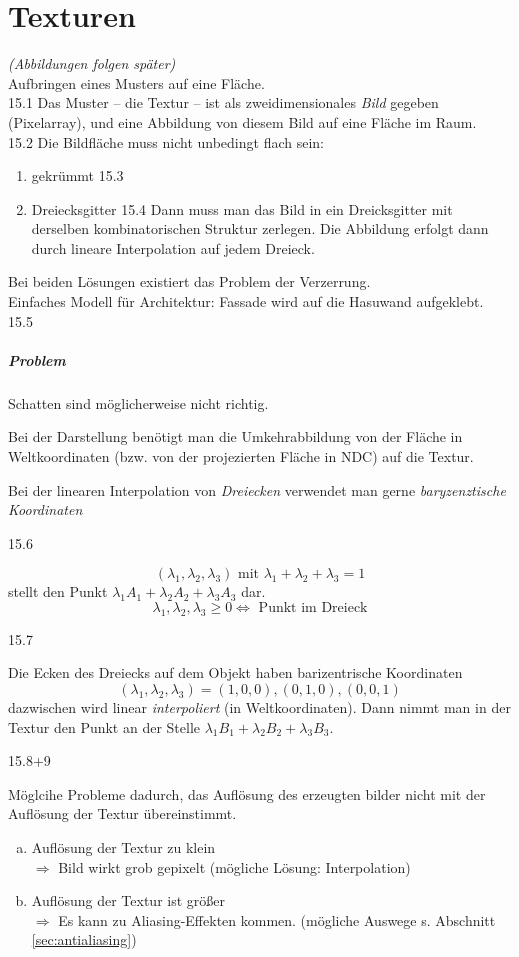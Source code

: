 \chapter{Texturen}
\emph{(Abbildungen folgen später)}\\
Aufbringen eines Musters auf eine Fläche.\\[1em]
15.1
Das Muster -- die Textur -- ist als zweidimensionales \emph{Bild} gegeben (Pixelarray), und eine Abbildung
von diesem Bild auf eine Fläche im Raum.\\[1em]
15.2
Die Bildfläche muss nicht unbedingt flach sein:
\begin{enumerate}
 \item gekrümmt 15.3
 \item Dreiecksgitter 15.4
	Dann muss man das Bild in ein Dreicksgitter mit derselben kombinatorischen Struktur zerlegen.
	Die Abbildung erfolgt dann durch lineare Interpolation auf jedem Dreieck.
\end{enumerate}
Bei beiden Lösungen existiert das Problem der Verzerrung.\\[1em]
Einfaches Modell für Architektur: Fassade wird auf die Hasuwand aufgeklebt.
15.5
\paragraph*{Problem} Schatten sind möglicherweise nicht richtig.

Bei der Darstellung benötigt man die Umkehrabbildung von der Fläche in Weltkoordinaten
(bzw. von der projezierten Fläche in NDC) auf die Textur.

Bei der linearen Interpolation von \emph{Dreiecken} verwendet man gerne \emph{baryzenztische Koordinaten}
\begin{center}
 15.6
\end{center}
\[(\lambda_1, \lambda_2, \lambda_3) \text{ mit } \lambda_1 + \lambda_2 + \lambda_3 = 1\]
stellt den Punkt $\lambda_1 A_1 + \lambda_2 A_2 + \lambda_3 A_3$ dar.
\[\lambda_1, \lambda_2, \lambda_3 \ge 0 \Leftrightarrow \text{ Punkt im Dreieck}\]
\begin{center}
 15.7
\end{center}
Die Ecken des Dreiecks auf dem Objekt haben barizentrische Koordinaten
\[(\lambda_1, \lambda_2, \lambda_3) = (1,0,0), (0,1,0), (0,0,1)\]
dazwischen wird linear \emph{interpoliert} (in Weltkoordinaten). Dann nimmt man in der Textur den Punkt an der
Stelle $\lambda_1 B_1 + \lambda_2 B_2 + \lambda_3 B_3$.
\begin{center}
 15.8+9
\end{center}
Möglcihe Probleme dadurch, das Auflösung des erzeugten bilder nicht mit der Auflösung der Textur übereinstimmt.
\begin{enumerate}[a)]
 \item Auflösung der Textur zu klein\\
	$\Rightarrow$ Bild wirkt grob gepixelt (mögliche Lösung: Interpolation)
 \item Auflösung der Textur ist größer\\
	$\Rightarrow$ Es kann zu Aliasing-Effekten kommen. (mögliche Auswege s. Abschnitt \ref{sec:antialiasing})
\end{enumerate}

